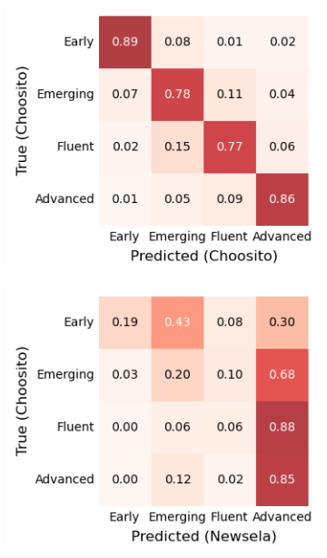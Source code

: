 \documentclass[thesis.tex]{subfiles}
\begin{document}
\begin{figure}
    \centering
    \begin{subfigure}[c]{.31\textwidth}
    \centering
    \includegraphics[width=\textwidth]{pictures/train_choosito_test_choosito.png}
    \end{subfigure}%
    \hfill
    \begin{subfigure}[c]{.31\textwidth}
    \centering
    \includegraphics[width=\textwidth]{pictures/train_newsela_test_choosito.png}
    \end{subfigure}%

\end{figure}
\end{document}
